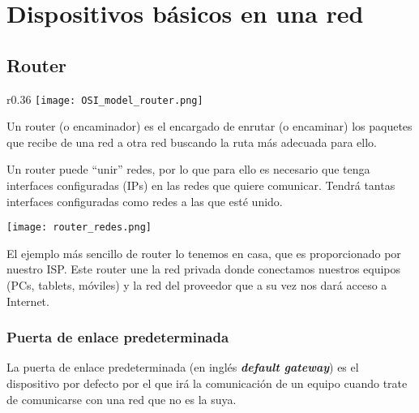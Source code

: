 \chapter{Dispositivos básicos en una red}

\section{Router}

\begin{wrapfigure}{r}{0.36\linewidth}
    \centering
    \vspace{-20pt}
    \texttt{[image: OSI\_model\_router.png]}
    \vspace{-32pt}
    \vspace{-10pt}
\end{wrapfigure}

Un router (o encaminador) es el encargado de enrutar (o encaminar) los paquetes que recibe de una red a otra red buscando la ruta más adecuada para ello.

Un router puede “unir” redes, por lo que para ello es necesario que tenga interfaces configuradas (IPs) en las redes que quiere comunicar. Tendrá tantas interfaces configuradas como redes a las que esté unido.


\begin{center}
    \vspace{-15pt}
    \texttt{[image: router\_redes.png]}
    \vspace{-5pt}
    \vspace{-15pt}
\end{center}

El ejemplo más sencillo de router lo tenemos en casa, que es proporcionado por nuestro ISP. Este router une la red privada donde conectamos nuestros equipos (PCs, tablets, móviles) y la red del proveedor que a su vez nos dará acceso a Internet.


\hypertarget{default_gateway}{}
\subsection{Puerta de enlace predeterminada}
La puerta de enlace predeterminada (en inglés \textit{\textbf{default gateway}}) es el dispositivo por defecto por el que irá la comunicación de un equipo cuando trate de comunicarse con una red que no es la suya.

